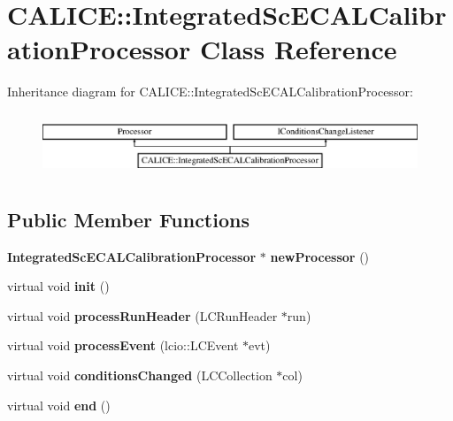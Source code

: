 \section{C\-A\-L\-I\-C\-E\-:\-:Integrated\-Sc\-E\-C\-A\-L\-Calibration\-Processor Class Reference}
\label{classCALICE_1_1IntegratedScECALCalibrationProcessor}
Inheritance diagram for C\-A\-L\-I\-C\-E\-:\-:Integrated\-Sc\-E\-C\-A\-L\-Calibration\-Processor\-:\begin{figure}[H]
\begin{center}
\leavevmode
\includegraphics[height=1.904762cm]{classCALICE_1_1IntegratedScECALCalibrationProcessor}
\end{center}
\end{figure}
\subsection*{Public Member Functions}
\begin{DoxyCompactItemize}
\item 
{\bf Integrated\-Sc\-E\-C\-A\-L\-Calibration\-Processor} $\ast$ {\bfseries new\-Processor} ()\label{classCALICE_1_1IntegratedScECALCalibrationProcessor_a80d8d7e14fa1e0838dc6b95f087a2705}

\item 
virtual void {\bfseries init} ()\label{classCALICE_1_1IntegratedScECALCalibrationProcessor_aa1eab42e9957dfcf3eb2c6c6fb91a13f}

\item 
virtual void {\bfseries process\-Run\-Header} (L\-C\-Run\-Header $\ast$run)\label{classCALICE_1_1IntegratedScECALCalibrationProcessor_acdffaa1d6fc44f196e4cb7a70cd02fcc}

\item 
virtual void {\bfseries process\-Event} (lcio\-::\-L\-C\-Event $\ast$evt)\label{classCALICE_1_1IntegratedScECALCalibrationProcessor_a146cb14128685b8841aac56473c77cad}

\item 
virtual void {\bfseries conditions\-Changed} (L\-C\-Collection $\ast$col)\label{classCALICE_1_1IntegratedScECALCalibrationProcessor_a50ff3bbb91c9e9f16882507b10b4edf7}

\item 
virtual void {\bfseries end} ()\label{classCALICE_1_1IntegratedScECALCalibrationProcessor_a4d3b93362d14bec35af499d016a21cd2}

\end{DoxyCompactItemize}
